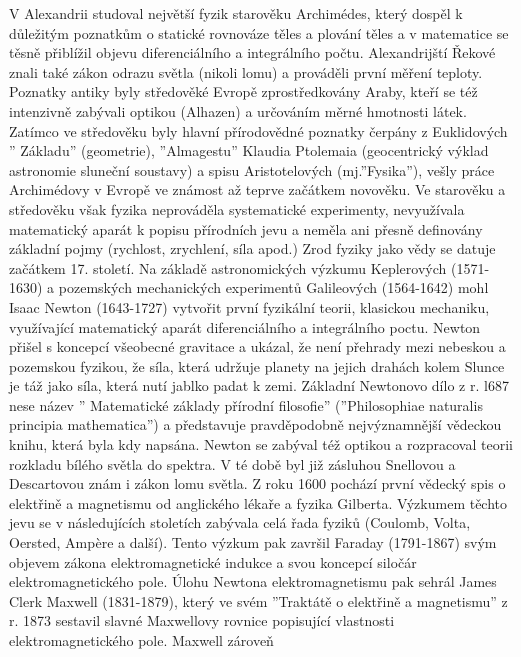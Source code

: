     V Alexandrii studoval největší fyzik starověku Archimédes, který dospěl k důležitým poznatkům o
    statické rovnováze těles a plování těles a v matematice se těsně přiblížil objevu
    diferenciálního a integrálního počtu. Alexandrijští Řekové znali také zákon odrazu světla
    (nikoli lomu) a prováděli první měření teploty. Poznatky antiky byly středověké Evropě
    zprostředkovány Araby, kteří se též intenzivně zabývali optikou (Alhazen) a určováním měrné
    hmotnosti látek. Zatímco ve středověku byly hlavní přírodovědné poznatky čerpány z Euklidových ”
    Základu” (geometrie), ”Almagestu” Klaudia Ptolemaia (geocentrický výklad astronomie sluneční
    soustavy) a spisu Aristotelových (mj.”Fysika”), vešly práce Archimédovy v Evropě ve známost až
    teprve začátkem novověku. Ve starověku a středověku však fyzika neprováděla systematické
    experimenty, nevyužívala matematický aparát k popisu přírodních jevu a neměla ani přesně
    definovány základní pojmy (rychlost, zrychlení, síla apod.) Zrod fyziky jako vědy se datuje
    začátkem 17. století. Na základě astronomických výzkumu Keplerových (1571-1630) a pozemských
    mechanických experimentů Galileových (1564-1642) mohl Isaac Newton (1643-1727) vytvořit první
    fyzikální teorii, klasickou mechaniku, využívající matematický aparát diferenciálního a
    integrálního poctu. Newton přišel s koncepcí všeobecné gravitace a ukázal, že není přehrady mezi
    nebeskou a pozemskou fyzikou, že síla, která udržuje planety na jejich drahách kolem Slunce je
    táž jako síla, která nutí jablko padat k zemi. Základní Newtonovo dílo z r. l687 nese název ”
    Matematické základy přírodní filosofie” (”Philosophiae naturalis principia mathematica”) a
    představuje pravděpodobně nejvýznamnější vědeckou knihu, která byla kdy napsána. Newton se
    zabýval též optikou a rozpracoval teorii rozkladu bílého světla do spektra. V té době byl již
    zásluhou Snellovou a Descartovou znám i zákon lomu světla. Z roku 1600 pochází první vědecký
    spis o elektřině a magnetismu od anglického lékaře a fyzika Gilberta. Výzkumem  těchto jevu se v
    následujících stoletích zabývala celá řada fyziků (Coulomb, Volta, Oersted, Amp\`{e}re a další).
    Tento výzkum pak završil Faraday (1791-1867) svým objevem zákona elektromagnetické indukce a
    svou koncepcí siločár elektromagnetického pole. Úlohu Newtona elektromagnetismu pak sehrál James
    Clerk Maxwell (1831-1879), který ve svém ”Traktátě o elektřině a magnetismu” z r. 1873 sestavil
    slavné Maxwellovy rovnice popisující vlastnosti elektromagnetického pole. Maxwell zároveň
